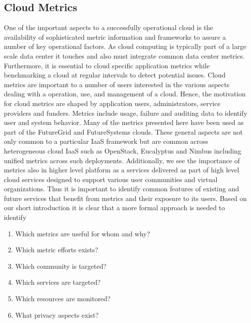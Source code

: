 \documentclass{sig-alternate-05-2015}
\begin{document}
\subsection{Cloud Metrics}

One of the important aspects to a successfully operational cloud is
the availability of sophisticated metric information and frameworks to
assure a number of key operational factors. As cloud computing is
typically part of a large scale data center it touches and also must
integrate common data center metrics. Furthermore, it is essential to
cloud specific application metrics while benchmarking a cloud at
regular intervals to detect potential issues. Cloud metrics are
important to a number of users interested in the various aspects
dealing with a operation, use, and management of a cloud. Hence, the
motivation for cloud metrics are shaped by application users,
administrators, service providers and funders. Metrics include usage,
failure and auditing data to identify user and system behavior. Many
of the metrics presented here have been used as part of the FutureGrid
and FutureSystems clouds. These general aspects are not only common to
a particular IaaS framework but are common across heterogeneous cloud
IaaS such as OpenStack, Eucalyptus and Nimbus including unified
metrics across such deployments.  Additionally, we see the importance
of metrics also in higher level platform as a services delivered as
part of high level cloud services designed to support various user
communities and virtual organizations. Thus it is important to
identify common features of existing and future services that benefit
from metrics and their exposure to its users. Based on our short
introduction it is clear that a more formal approach is needed to
identify

\begin{enumerate}
\setlength\itemsep{-2pt}
\item Which metrics are useful for whom and why?
\item Which metric efforts exists?
\item Which community is targeted?
\item Which services are targeted?
\item Which resources are monitored?
\item What privacy aspects exist? 
\end{enumerate}
\end{document}
